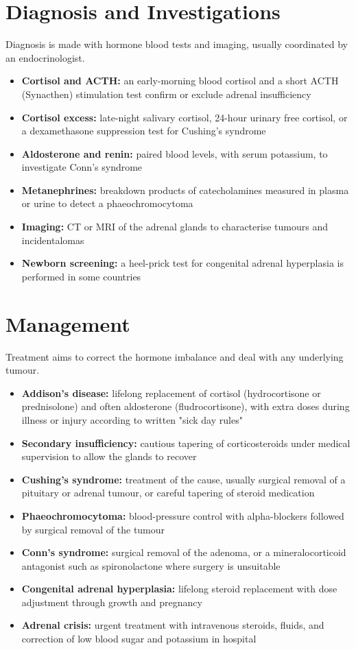 \section*{Diagnosis and Investigations}
Diagnosis is made with hormone blood tests and imaging, usually coordinated by an endocrinologist.

\begin{itemize}
    \item \textbf{Cortisol and ACTH:} an early-morning blood cortisol and a short ACTH (Synacthen) stimulation test confirm or exclude adrenal insufficiency
    \item \textbf{Cortisol excess:} late-night salivary cortisol, 24-hour urinary free cortisol, or a dexamethasone suppression test for Cushing's syndrome
    \item \textbf{Aldosterone and renin:} paired blood levels, with serum potassium, to investigate Conn's syndrome
    \item \textbf{Metanephrines:} breakdown products of catecholamines measured in plasma or urine to detect a phaeochromocytoma
    \item \textbf{Imaging:} CT or MRI of the adrenal glands to characterise tumours and incidentalomas
    \item \textbf{Newborn screening:} a heel-prick test for congenital adrenal hyperplasia is performed in some countries
\end{itemize}

\section*{Management}
Treatment aims to correct the hormone imbalance and deal with any underlying tumour.

\begin{itemize}
    \item \textbf{Addison's disease:} lifelong replacement of cortisol (hydrocortisone or prednisolone) and often aldosterone (fludrocortisone), with extra doses during illness or injury according to written "sick day rules"
    \item \textbf{Secondary insufficiency:} cautious tapering of corticosteroids under medical supervision to allow the glands to recover
    \item \textbf{Cushing's syndrome:} treatment of the cause, usually surgical removal of a pituitary or adrenal tumour, or careful tapering of steroid medication
    \item \textbf{Phaeochromocytoma:} blood-pressure control with alpha-blockers followed by surgical removal of the tumour
    \item \textbf{Conn's syndrome:} surgical removal of the adenoma, or a mineralocorticoid antagonist such as spironolactone where surgery is unsuitable
    \item \textbf{Congenital adrenal hyperplasia:} lifelong steroid replacement with dose adjustment through growth and pregnancy
    \item \textbf{Adrenal crisis:} urgent treatment with intravenous steroids, fluids, and correction of low blood sugar and potassium in hospital
\end{itemize}

